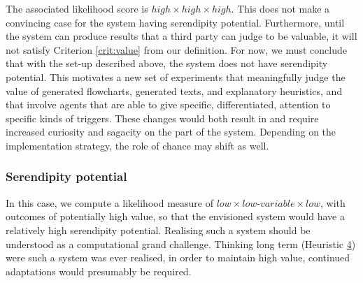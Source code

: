 
The associated likelihood score is $\mathit{high}\times \mathit{high} \times\mathit{high}$.
This does not make a convincing case for
the system having serendipity potential.
Furthermore, until the system can produce
results that a third party can judge
to be valuable, it will not satisfy Criterion \ref{crit:value} from our
definition.  For now, we must conclude that
with the set-up described above, the system
does not have serendipity potential.
This motivates a new set of experiments that meaningfully
judge the value of generated flowcharts, generated texts, and
explanatory heuristics, and that involve agents that
are able to give specific, differentiated,
attention to specific kinds of triggers.
These changes would both result in and require
increased curiosity and sagacity on the part of the system.  Depending on the
implementation strategy, the role of chance may shift as well.  


\subsubsection{Serendipity potential}

In this case, we compute a likelihood measure of
$\mathit{low}\times\mathit{low}\text{-}\mathit{variable}\times\mathit{low}$, with outcomes
of potentially high value, so that the envisioned system would have a
relatively high serendipity potential.  Realising such a system should
be understood as a computational grand challenge.  Thinking long
term (Heuristic \hyperref[heur:4]{4}) were such a system
was ever realised, in order to maintain high value,
continued adaptations would presumably be required.



